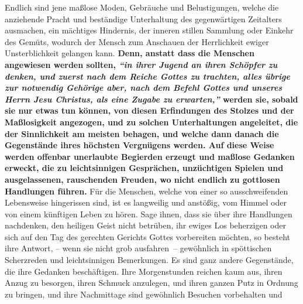 Endlich sind jene
maßlose Moden, Gebräuche
und Belustigungen, welche die
anziehende Pracht und beständige Unterhaltung des gegenwärtigen Zeitalters
ausmachen, ein mächtiges Hindernis, der inneren stillen
Sammlung oder Einkehr des
Gemüts, wodurch der Mensch zum Anschauen der Herrlichkeit ewiger
Unsterblichkeit gelangen kann.
\label{ref:17_01_erziehung}
\textbf{Denn, anstatt dass die Menschen angewiesen werden
sollten,
\textit{"`in ihrer Jugend an ihren Schöpfer zu denken, und zuerst nach dem
Reiche Gottes zu trachten, alles übrige zur 
notwendig
Gehörige aber, nach dem
Befehl Gottes und unseres Herrn Jesu Christus, als eine Zugabe zu
erwarten,"'}
werden sie, sobald sie nur
etwas tun können, von diesen Erfindungen des Stolzes und der
Maßlosigkeit
angezogen, und zu solchen Unterhaltungen angeleitet, die der Sinnlichkeit am
meisten behagen, und welche dann danach die Gegenstände ihres höchsten
Vergnügens werden. Auf diese Weise werden offenbar unerlaubte Begierden erzeugt
und maßlose Gedanken
erweckt, die zu
leichtsinnigen Gesprächen, unzüchtigen
Spielen und ausgelassenen, rauschenden Freuden, wo nicht endlich zu gottlosen
Handlungen führen.} Für die Menschen, welche von einer so ausschweifenden
Lebensweise hingerissen sind, ist es langweilig und anstößig, vom Himmel oder
von einem künftigen Leben zu hören. Sage ihnen, dass sie über ihre Handlungen
nachdenken, den heiligen Geist nicht betrüben, ihr ewiges
Los beherzigen oder
sich auf den Tag des gerechten Gerichts Gottes
vorbereiten möchten, so besteht
ihre Antwort, -- wenn sie nicht grob ausfahren~-- gewöhnlich in spöttischen
Scherzreden und leichtsinnigen Bemerkungen. Es sind ganz andere Gegenstände, die
ihre Gedanken beschäftigen. Ihre Morgenstunden reichen kaum aus, ihren Anzug zu
besorgen, ihren Schmuck anzulegen, und ihren ganzen Putz in Ordnung zu bringen,
und ihre Nachmittage sind gewöhnlich Besuchen vorbehalten und
\label{ref:17_01_schauspiel}

